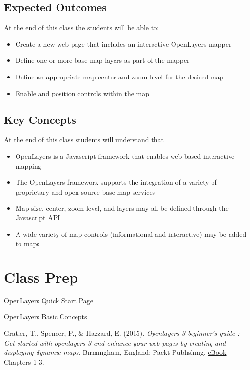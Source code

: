 \documentclass[]{book}
\providecommand{\tightlist}{%
  \setlength{\itemsep}{0pt}\setlength{\parskip}{0pt}}
\begin{document}
\subsection{Expected Outcomes}\label{expected-outcomes}

At the end of this class the students will be able to:

\begin{itemize}
\tightlist
\item
  Create a new web page that includes an interactive OpenLayers mapper
\item
  Define one or more base map layers as part of the mapper
\item
  Define an appropriate map center and zoom level for the desired map
\item
  Enable and position controls within the map
\end{itemize}

\subsection{Key Concepts}\label{key-concepts}

At the end of this class students will understand that

\begin{itemize}
\tightlist
\item
  OpenLayers is a Javascript framework that enables web-based
  interactive mapping
\item
  The OpenLayers framework supports the integration of a variety of
  proprietary and open source base map services
\item
  Map size, center, zoom level, and layers may all be defined through
  the Javascript API
\item
  A wide variety of map controls (informational and interactive) may be
  added to maps
\end{itemize}

\section{Class Prep}\label{week10-prep}

\href{http://openlayers.org/en/v3.14.2/doc/quickstart.html}{OpenLayers
Quick Start Page}

\href{http://openlayers.org/en/v3.14.2/doc/tutorials/concepts.html}{OpenLayers
Basic Concepts}

Gratier, T., Spencer, P., \& Hazzard, E. (2015). \emph{Openlayers 3
beginner's guide : Get started with openlayers 3 and enhance your web
pages by creating and displaying dynamic maps}. Birmingham, England:
Packt Publishing.
\href{https://unm-on-worldcat-org.libproxy.unm.edu/oclc/903963849?databaseList=1271,143,1487,1533,1540,1672,1708,173,1925,2006,2007,203,2201,2237,2259,2260,2261,2262,2263,2264,2267,2268,2281,2328,3036,3201,638}{eBook}
Chapters 1-3.
\end{document}
